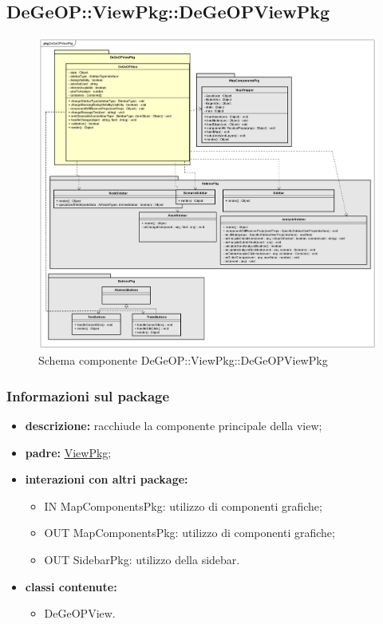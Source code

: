 \subsection{DeGeOP::ViewPkg::DeGeOPViewPkg}
\label{pkg::DeGeOPViewPkg}
\begin{figure}[H]
	\centering
	\includegraphics[width=\textwidth]{img/PkgDiagram/DeGeOPViewPkg.png}
	\caption{Schema componente DeGeOP::ViewPkg::DeGeOPViewPkg}
\end{figure}
\subsubsection{Informazioni sul package}
\begin{itemize}
	\item \textbf{descrizione:} racchiude la componente principale della view;
	\item \textbf{padre:} \hyperref[pkg::ViewPkg]{ViewPkg};
	\item \textbf{interazioni con altri package:} 
	\begin{itemize}
		\item IN MapComponentsPkg: utilizzo di componenti grafiche;
		\item OUT MapComponentsPkg: utilizzo di componenti grafiche;
		\item OUT SidebarPkg: utilizzo della sidebar.
	\end{itemize}
	\item \textbf{classi contenute:}
	\begin{itemize}
		\item DeGeOPView.
	\end{itemize}
\end{itemize}
